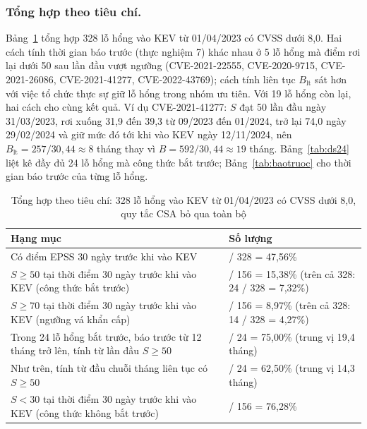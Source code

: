 \documentclass[runningheads]{llncs}
\begin{document}
\subsubsection{Tổng hợp theo tiêu chí.}
Bảng~\ref{tab:tonghopth} tổng hợp 328 lỗ hổng vào KEV từ 01/04/2023 có CVSS dưới 8,0. Hai cách tính thời gian báo trước (thực
nghiệm 7) khác nhau ở 5 lỗ hổng mà điểm rơi lại dưới 50 sau lần đầu vượt ngưỡng (CVE-2021-22555, CVE-2020-9715,
CVE-2021-26086, CVE-2021-41277, CVE-2022-43769); cách tính liên tục $B_{\text{lt}}$ sát hơn với việc tổ chức thực
sự giữ lỗ hổng trong nhóm ưu tiên. Với 19 lỗ hổng còn lại, hai cách cho cùng kết quả. Ví dụ CVE-2021-41277: $S$
đạt 50 lần đầu ngày 31/03/2023, rơi xuống 31,9 đến 39,3 từ 09/2023 đến 01/2024, trở lại 74,0 ngày 29/02/2024 và
giữ mức đó tới khi vào KEV ngày 12/11/2024, nên $B_{\text{lt}} = 257 / 30{,}44 \approx 8$ tháng thay vì
$B = 592 / 30{,}44 \approx 19$ tháng. Bảng~\ref{tab:ds24} liệt kê đầy đủ 24 lỗ hổng mà công thức bắt trước;
Bảng~\ref{tab:baotruoc} cho thời gian báo trước của từng lỗ hổng.

\begin{table}
\centering
\caption{Tổng hợp theo tiêu chí: 328 lỗ hổng vào KEV từ 01/04/2023 có CVSS dưới 8,0, quy tắc CSA bỏ qua toàn bộ}\label{tab:tonghopth}
\small
\begin{tabular}{>{\raggedright\arraybackslash}p{6.6cm}>{\raggedright\arraybackslash}p{4.4cm}}
\toprule
Hạng mục & Số lượng \\
\midrule
Có điểm EPSS 30 ngày trước khi vào KEV & 156 / 328 = 47,56\% \\
$S \ge 50$ tại thời điểm 30 ngày trước khi vào KEV (công thức bắt trước) & 24 / 156 = 15,38\% (trên cả 328: 24 / 328 = 7,32\%) \\
$S \ge 70$ tại thời điểm 30 ngày trước khi vào KEV (ngưỡng vá khẩn cấp) & 14 / 156 = 8,97\% (trên cả 328: 14 / 328 = 4,27\%) \\
Trong 24 lỗ hổng bắt trước, báo trước từ 12 tháng trở lên, tính từ lần đầu $S \ge 50$ & 18 / 24 = 75,00\% (trung vị 19,4 tháng) \\
Như trên, tính từ đầu chuỗi tháng liên tục có $S \ge 50$ & 15 / 24 = 62,50\% (trung vị 14,3 tháng) \\
$S < 30$ tại thời điểm 30 ngày trước khi vào KEV (công thức không bắt trước) & 119 / 156 = 76,28\% \\
\bottomrule
\end{tabular}
\end{table}
\end{document}
